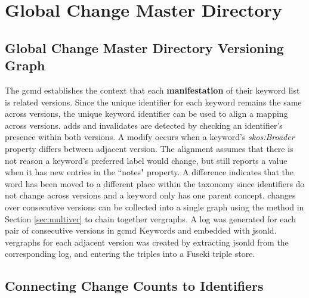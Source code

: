 \section{Global Change Master Directory}

\subsection{Global Change Master Directory Versioning Graph}

The \gls{gcmd} establishes the context that each \textbf{manifestation} of their keyword list is related versions.
Since the unique identifier for each keyword remains the same across versions, the unique keyword identifier can be used to align a mapping across \glspl{version}.
\Glspl{add} and \glspl{invalidate} are detected by checking an identifier's presence within both versions.
A \gls{modify} occurs when a keyword's \textit{skos:Broader} property differs between adjacent \gls{version}.
The alignment assumes that there is not reason a keyword's preferred label would change, but still reports a value when it has new entries in the ``notes" property.
A difference indicates that the word has been moved to a different place within the taxonomy since identifiers do not change across versions and a keyword only has one parent concept.
\Glspl{change} over consecutive \glspl{version} can be collected into a single graph using the method in Section \ref{sec:multiver} to chain together \glspl{vergraph}.
A \gls{log} was generated for each pair of consecutive versions in \gls{gcmd} Keywords and embedded with \gls{jsonld}.
\Glspl{vergraph} for each adjacent \gls{version} was created by extracting \gls{jsonld} from the corresponding \gls{log}, and entering the triples into a Fuseki triple store.

\subsection{Connecting Change Counts to Identifiers} \label{gcmd_85}


